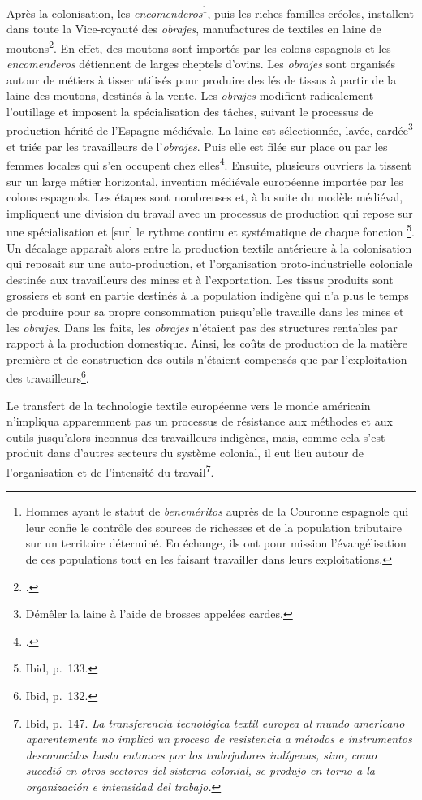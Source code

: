 Après la colonisation, les \textit{encomenderos}\footnote{Hommes ayant le statut de \textit{beneméritos} auprès de la Couronne espagnole qui leur confie le contrôle des sources de richesses et de la population tributaire sur un territoire déterminé. En échange, ils ont pour mission l'évangélisation de ces populations tout en les faisant travailler dans leurs exploitations.}, puis les riches familles créoles, installent dans toute la Vice-royauté des \textit{obrajes}, manufactures de textiles en laine de moutons\footcite{ortizdelatabladucasseObrajesObrajerosQuito1982}. En effet, des moutons sont importés par les colons espagnols et les \textit{encomenderos} détiennent de larges cheptels d'ovins. 
Les \textit{obrajes} sont organisés autour de métiers à tisser utilisés pour produire des lés de tissus à partir de la laine des moutons, destinés à la vente. Les \textit{obrajes} modifient radicalement l'outillage et imposent la spécialisation des tâches, suivant le processus de production hérité de l'Espagne médiévale. La laine est sélectionnée, lavée, cardée\footnote{Démêler la laine à l'aide de brosses appelées cardes.} et triée par les travailleurs de l'\textit{obrajes}. Puis elle est filée sur place ou par les femmes locales qui s'en occupent chez elles\footcite[p.49]{minogrijalvaManufacturaColonialConstitucion1993}. Ensuite, plusieurs ouvriers la tissent sur un large métier horizontal, invention médiévale européenne importée par les colons espagnols. Les étapes sont nombreuses et, à la suite du modèle médiéval, impliquent une division du travail avec un processus de production qui repose sur une \og spécialisation et [sur] le rythme continu et systématique de chaque fonction \fg\footnote{Ibid, p.~133.}. Un décalage apparaît alors entre la production textile antérieure à la colonisation qui reposait sur une auto-production, et l'organisation proto-industrielle coloniale destinée aux travailleurs des mines et à l'exportation. Les tissus produits sont grossiers et sont en partie destinés à la population indigène qui n'a plus le temps de produire pour sa propre consommation puisqu'elle travaille dans les mines et les \textit{obrajes}. Dans les faits, les \textit{obrajes} n'étaient pas des structures rentables par rapport à la production domestique. Ainsi, les coûts de production de la matière première et de construction des outils n'étaient compensés que par l'exploitation des travailleurs\footnote{Ibid, p.~132.}.
\begin{citer}
	Le transfert de la technologie textile européenne vers le monde américain n'impliqua apparemment pas un processus de résistance aux méthodes et aux outils jusqu'alors inconnus des travailleurs indigènes, mais, comme cela s'est produit dans d'autres secteurs du système colonial, il eut lieu autour de l'organisation et de l'intensité du travail\footnote{Ibid, p.~147. \textit{La transferencia tecnológica textil europea al mundo americano aparentemente no implicó un proceso de resistencia a métodos e instrumentos desconocidos hasta entonces por los trabajadores indígenas, sino, como sucedió en otros sectores del sistema colonial, se produjo en torno a la organización e intensidad del trabajo.}}.
\end{citer}
